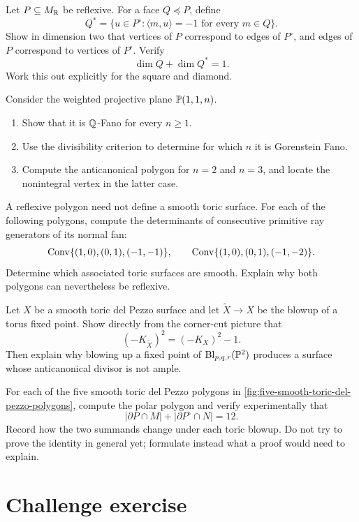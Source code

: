 \begin{exercises}
\item Let \(P\subseteq M_\RR\) be reflexive. For a face \(Q\preceq P\),
define
\[
Q^*
=
\{u\in P^\circ:\langle m,u\rangle=-1
\text{ for every }m\in Q\}.
\]
Show in dimension two that vertices of \(P\) correspond to edges of
\(P^\circ\), and edges of \(P\) correspond to vertices of
\(P^\circ\). Verify
\[
\dim Q+\dim Q^*=1.
\]
Work this out explicitly for the square and diamond.

\item Consider the weighted projective plane \(\PP(1,1,n)\).
\begin{enumerate}[label=(\alph*),wide=0pt]
\item Show that it is \(\QQ\)-Fano for every \(n\geq1\).
\item Use the divisibility criterion to determine for which \(n\) it
is Gorenstein Fano.
\item Compute the anticanonical polygon for \(n=2\) and \(n=3\), and
locate the nonintegral vertex in the latter case.
\end{enumerate}

\item A reflexive polygon need not define a smooth toric surface.
For each of the following polygons, compute the determinants of
consecutive primitive ray generators of its normal fan:
\[
\Conv\{(1,0),(0,1),(-1,-1)\},
\qquad
\Conv\{(1,0),(0,1),(-1,-2)\}.
\]
Determine which associated toric surfaces are smooth. Explain why
both polygons can nevertheless be reflexive.

\item Let \(X\) be a smooth toric del Pezzo surface and let
\(\widetilde X\to X\) be the blowup of a torus fixed point.
Show directly from the corner-cut picture that
\[
(-K_{\widetilde X})^2=(-K_X)^2-1.
\]
Then explain why blowing up a fixed point of
\(\Blp{\PP^2}{p,q,r}\) produces a surface whose anticanonical divisor
is not ample.

\item For each of the five smooth toric del Pezzo polygons in
\cref{fig:five-smooth-toric-del-pezzo-polygons}, compute the polar
polygon and verify experimentally that
\[
|\partial P\cap M|+|\partial P^\circ\cap N|=12.
\]
Record how the two summands change under each toric blowup. Do not try
to prove the identity in general yet; formulate instead what a proof
would need to explain.

\end{exercises}

\clearpage
\section*{Challenge exercise}

